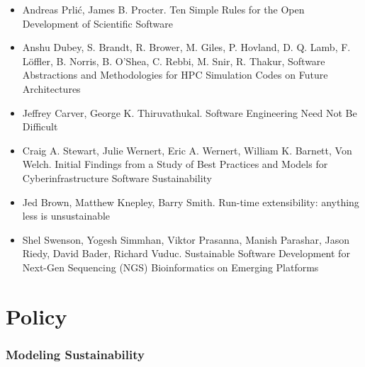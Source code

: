 \documentclass[11pt, oneside]{amsart}
\begin{document}
\begin{itemize}

\item Andreas Prli\'{c}, James B. Procter. Ten Simple Rules for the
  Open Development of Scientific Software~\cite{Prlic_WSSSPE}

\item Anshu Dubey, S. Brandt, R. Brower, M. Giles, P. Hovland,
  D. Q. Lamb, F. Löffler, B. Norris, B. O'Shea, C. Rebbi, M. Snir,
  R. Thakur, Software Abstractions and Methodologies for HPC
  Simulation Codes on Future Architectures~\cite{Dubey2_WSSSPE}

\item Jeffrey Carver, George K. Thiruvathukal. Software Engineering
  Need Not Be Difficult~\cite{Carver_WSSSPE}

\item Craig A. Stewart, Julie Wernert, Eric A. Wernert, William
  K. Barnett, Von Welch. Initial Findings from a Study of Best
  Practices and Models for Cyberinfrastructure Software Sustainability~\cite{Stewart_WSSSPE}

\item Jed Brown, Matthew Knepley, Barry Smith. Run-time extensibility:
  anything less is unsustainable~\cite{Brown_WSSSPE}

\item Shel Swenson, Yogesh Simmhan, Viktor Prasanna, Manish Parashar,
  Jason Riedy, David Bader, Richard Vuduc. Sustainable Software
  Development for Next-Gen Sequencing (NGS) Bioinformatics on Emerging
  Platforms~\cite{Swenson_WSSSPE}

\end{itemize}

\section*{Policy}

\subsubsection*{Modeling Sustainability}
\end{document}
